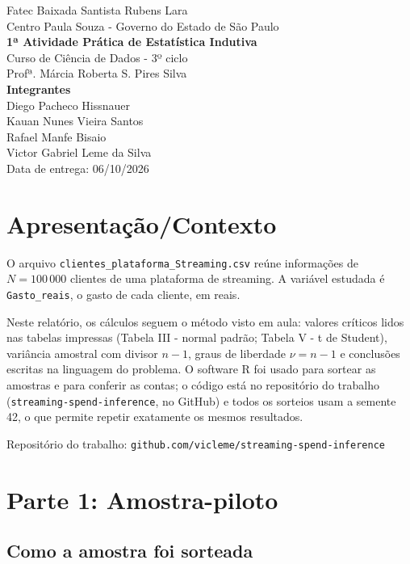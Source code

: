 \documentclass[12pt,a4paper]{article}
\begin{document}
\begin{center}
{\large Fatec Baixada Santista Rubens Lara}\\
Centro Paula Souza - Governo do Estado de São Paulo\\[1.2em]
{\Large\textbf{1ª Atividade Prática de Estatística Indutiva}}\\[0.6em]
Curso de Ciência de Dados - 3º ciclo\\
Profª. Márcia Roberta S. Pires Silva\\[1.2em]
\textbf{Integrantes}\\
Diego Pacheco Hissnauer\\
Kauan Nunes Vieira Santos\\
Rafael Manfe Bisaio\\
Victor Gabriel Leme da Silva\\[1.2em]
Data de entrega: 06/10/2026
\end{center}

\vspace{1em}

\section*{Apresentação/Contexto}

O arquivo \texttt{clientes\_plataforma\_Streaming.csv} reúne informações de $N = 100\,000$ clientes de uma plataforma de streaming. A variável estudada é \texttt{Gasto\_reais}, o gasto de cada cliente, em reais.

Neste relatório, os cálculos seguem o método visto em aula: valores críticos lidos nas tabelas impressas (Tabela III - normal padrão; Tabela V - t de Student), variância amostral com divisor $n-1$, graus de liberdade $\nu = n-1$ e conclusões escritas na linguagem do problema. O software R foi usado para sortear as amostras e para conferir as contas; o código está no repositório do trabalho (\texttt{streaming-spend-inference}, no GitHub) e todos os sorteios usam a semente 42, o que permite repetir exatamente os mesmos resultados.

Repositório do trabalho: \texttt{github.com/vicleme/streaming-spend-inference}

\section{Parte 1: Amostra-piloto}

\subsection*{Como a amostra foi sorteada}
\end{document}
